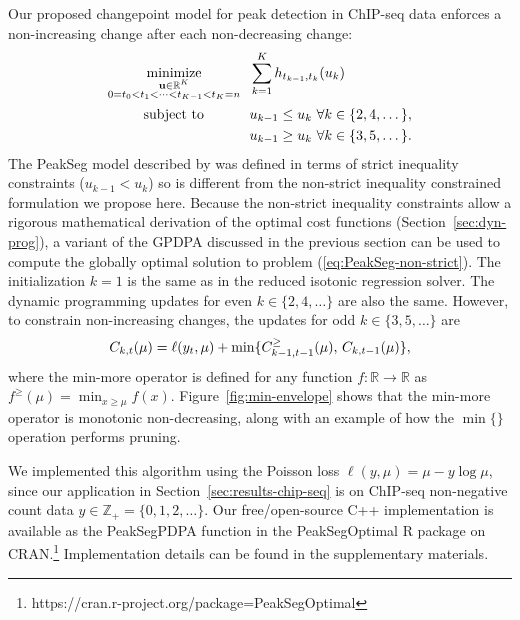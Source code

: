\documentclass[aoas]{imsart}
\newcommand{\url}[1]{#1}
\DeclareMathOperator*{\minimize}{minimize}
\newcommand{\ZZ}{\mathbb Z}
\newcommand{\RR}{\mathbb R}
\begin{document}
Our proposed changepoint model for peak detection in ChIP-seq data enforces a
non-increasing change after each non-decreasing change:
\begin{align}
  \label{eq:PeakSeg-non-strict}
  \minimize_{
        \substack{\mathbf u\in\RR^K \\
    0=t_0<t_1<\cdots<t_{K-1}<t_K=n
}
    } &\ \ 
  \sum_{k=1}^K h_{t_{k-1}, t_k}(u_k)\\
      \text{subject to \hskip 0.8cm} &\ \ u_{k-1} \leq u_k\ \forall k\in\{2,4,\dots\},
  \nonumber\\
  &\ \ u_{k-1} \geq u_k\ \forall k\in\{3,5,\dots\}.
  \nonumber
\nonumber
\end{align}
The PeakSeg model described by \citet{HOCKING-PeakSeg} was defined in
terms of strict inequality constraints ($u_{k-1}<u_k$) so is 
different from the non-strict inequality constrained formulation we
propose here. Because the non-strict inequality constraints allow a
rigorous mathematical derivation of the optimal cost functions
(Section~\ref{sec:dyn-prog}), a variant of the GPDPA discussed in the
previous section can be used to compute the globally optimal solution
to problem (\ref{eq:PeakSeg-non-strict}). The initialization $k=1$ is
the same as in the reduced isotonic regression solver. The dynamic
programming updates for even $k\in\{2, 4, \dots\}$ are also the
same. However, to constrain non-increasing changes, the updates for
odd $k\in\{3, 5, \dots\}$ are
\begin{equation}
  \FCC_{k,t}(\mu) = \ell(y_t, \mu) + \min\{
  \FCC_{k-1,t-1}^\geq(\mu),\, \FCC_{k,t-1}(\mu)
  \},
\end{equation}
where the min-more operator is defined for any function $f:\RR\rightarrow\RR$ as
$f^\geq(\mu) = \min_{x\geq \mu} f(x)$. Figure~\ref{fig:min-envelope}
shows that the min-more operator is monotonic non-decreasing, along
with an example of how the $\min\{\}$ operation performs pruning.

We implemented this algorithm using the Poisson loss
$\ell(y, \mu) = \mu - y\log \mu$, since our application in
Section~\ref{sec:results-chip-seq} is on ChIP-seq non-negative count data
$y\in\ZZ_+ = \{0, 1, 2, \dots\}$.
Our free/open-source C++ implementation is
available as the PeakSegPDPA function in the PeakSegOptimal R package
on
CRAN.\footnote{\url{https://cran.r-project.org/package=PeakSegOptimal}}
Implementation details can be found in the supplementary materials.
\end{document}
